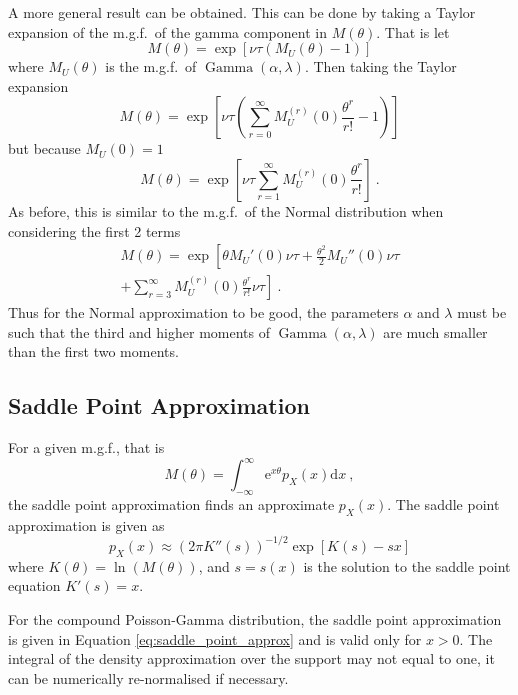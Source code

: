 \documentclass[a4paper]{proc}
\DeclareMathOperator{\gammaDist}{Gamma}
\newcommand{\euler}{\mathrm{e}}
\newcommand{\diff}{\mathrm{d}}
\begin{document}
A more general result can be obtained. This can be done by taking a Taylor expansion of the m.g.f.~of the gamma component in $M(\theta)$. That is let
\begin{equation}
M(\theta)=\exp\left[
\nu\tau\left(M_U(\theta)-1\right)
\right]
\end{equation}
where $M_U(\theta)$ is the m.g.f.~of $\gammaDist(\alpha,\lambda)$. Then taking the Taylor expansion
\begin{equation*}
M(\theta)=\exp\left[
\nu\tau\left(
\sum_{r=0}^\infty M_U^{(r)}(0)\frac{\theta^r}{r!}
-1
\right)
\right]
\end{equation*}
but because $M_U(0)=1$
\begin{equation}
M(\theta)=\exp\left[
\nu\tau
\sum_{r=1}^\infty M_U^{(r)}(0)\frac{\theta^r}{r!}
\right] \ .
\end{equation}
As before, this is similar to the m.g.f.~of the Normal distribution when considering the first 2 terms
\begin{multline}
M(\theta)=\exp\left[
\theta M_U'(0)\nu\tau+\frac{\theta^2}{2} M_U''(0)\nu\tau
\right.\\\left.+
\sum_{r=3}^\infty M_U^{(r)}(0)\frac{\theta^r}{r!}\nu\tau\right] \ .
\end{multline}
Thus for the Normal approximation to be good, the parameters $\alpha$ and $\lambda$ must be such that the third and higher moments of $\gammaDist(\alpha,\lambda)$ are much smaller than the first two moments.

\subsection{Saddle Point Approximation}
For a given m.g.f., that is
\begin{equation}
M(\theta)=\int_{-\infty}^{\infty}\euler^{x\theta} p_X(x) \diff x \ ,
\end{equation}
the saddle point approximation \cite{daniels1954saddlepoint} \cite{butler2007saddlepoint} finds an approximate $p_X(x)$. The saddle point approximation is given as
\begin{equation}
p_X(x)\approx\left(2\pi K''(s)\right)^{-1/2}\exp\left[K(s)-sx\right]
\end{equation}
where $K(\theta) = \ln\left(M(\theta)\right)$, and $s=s(x)$ is the solution to the saddle point equation $K'(s)=x$.

For the compound Poisson-Gamma distribution, the saddle point approximation is given in Equation \eqref{eq:saddle_point_approx} and is valid only for $x>0$. The integral of the density approximation over the support may not equal to one, it can be numerically re-normalised if necessary.
\end{document}
